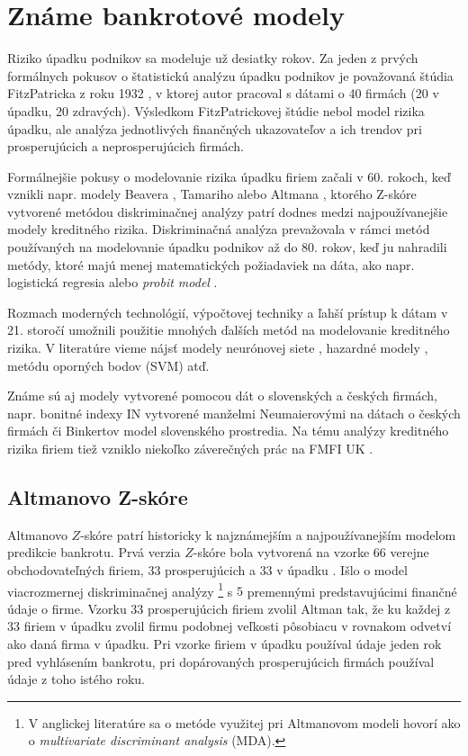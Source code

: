 \section{Známe bankrotové modely}

Riziko úpadku podnikov sa modeluje už desiatky rokov.
Za jeden z prvých formálnych pokusov o štatistickú analýzu úpadku podnikov je považovaná štúdia FitzPatricka z roku 1932 \cite{fitzpatrick},
v ktorej autor pracoval s dátami o 40 firmách (20 v úpadku, 20 zdravých).
Výsledkom FitzPatrickovej štúdie nebol model rizika úpadku, ale analýza jednotlivých finančných ukazovateľov a ich trendov pri prosperujúcich a neprosperujúcich firmách.

Formálnejšie pokusy o modelovanie rizika úpadku firiem začali v 60. rokoch, keď vznikli napr. modely Beavera \cite{beaver}, Tamariho \cite{tamari} alebo Altmana \cite{altman1968},
ktorého Z-skóre vytvorené metódou diskriminačnej analýzy patrí dodnes medzi najpoužívanejšie modely kreditného rizika.
Diskriminačná analýza prevažovala v rámci metód používaných na modelovanie úpadku podnikov až do 80. rokov, keď ju nahradili metódy,
ktoré majú menej matematických požiadaviek na dáta, ako napr. logistická regresia alebo \emph{probit model} \cite{gruszczynski}.

Rozmach moderných technológií, výpočtovej techniky a ľahší prístup k dátam v 21. storočí umožnili použitie mnohých ďalších metód na modelovanie kreditného rizika.
V literatúre vieme nájsť modely neurónovej siete \cite{tsai}, hazardné modely \cite{shumway}, metódu oporných bodov (SVM) \cite{min} atď.

Známe sú aj modely vytvorené pomocou dát o slovenských a českých firmách, napr. bonitné indexy IN vytvorené manželmi Neumaierovými na dátach o českých firmách
či Binkertov model \cite{zalai} slovenského prostredia.
Na tému analýzy kreditného rizika firiem tiež vzniklo niekoľko záverečných prác na FMFI UK \cite{ondrusekova, bohdal}.

\subsection{Altmanovo Z-skóre}

Altmanovo \(Z\)-skóre patrí historicky k najznámejším a najpoužívanejším modelom predikcie bankrotu.
Prvá verzia \(Z\)-skóre bola vytvorená na vzorke \(66\) verejne obchodovateľných firiem, \(33\) prosperujúcich a \(33\) v úpadku \cite{altman1968}.
Išlo o model viacrozmernej diskriminačnej analýzy
\footnote{V anglickej literatúre sa o metóde využitej pri Altmanovom modeli hovorí ako o \emph{multivariate discriminant analysis} (MDA).}
s \(5\) premennými predstavujúcimi finančné údaje o firme.
Vzorku 33 prosperujúcich firiem zvolil Altman tak, že ku každej z \(33\) firiem v úpadku zvolil firmu podobnej veľkosti pôsobiacu v rovnakom odvetví ako daná firma v úpadku.
Pri vzorke firiem v úpadku používal údaje jeden rok pred vyhlásením bankrotu, pri dopárovaných prosperujúcich firmách používal údaje z toho istého roku.

